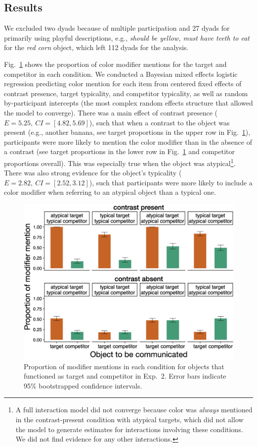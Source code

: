 \documentclass[10pt,letterpaper]{article}
\newcommand{\figref}[1]{Fig.~\ref{#1}}
\begin{document}
\subsection{Results}
We excluded two dyads because of multiple participation and 27 dyads for primarily using playful descriptions, e.g., \textit{should be yellow, must have teeth to eat} for the \textit{red corn} object, which left 112 dyads for the analysis.

\figref{prod-results} shows the proportion of color modifier mentions for the target and competitor in each condition. We conducted a Bayesian mixed effects logistic regression predicting color mention for each item from centered fixed effects of contrast presence, target typicality, and competitor typicality, as well as random by-participant intercepts (the most complex random effects structure that allowed the model to converge). 
There was a main effect of contrast presence ($E=5.25,\ CI=[4.82, 5.69]$), such that when a contrast to the object was present (e.g., another banana, see target proportions in the upper row in \figref{prod-results}), participants were more likely to mention the color modifier than in the absence of a contrast (see target proportions in the lower row in \figref{prod-results} and competitor proportions overall). This was especially true when the object was atypical\footnote{A full interaction model did not converge because color was \emph{always} mentioned in the contrast-present condition with atypical targets, which did not allow the model to generate estimates for interactions involving these conditions. We did not find evidence for any other interactions.}. There was also strong evidence for the object's typicality ($E=2.82,\ CI=[2.52, 3.12]$), such that participants were more likely to include a color modifier when referring to an atypical object than a typical one.

\begin{figure}
	\begin{center}
		\includegraphics[width=.475\textwidth]{graphs/prod-bycond-paper.pdf}
	\end{center}
\caption{Proportion of modifier mentions in each condition for objects that functioned as target and competitor in Exp.~2. Error bars indicate 95\% bootstrapped confidence intervals.} 
\label{prod-results}
\end{figure}
\end{document}
